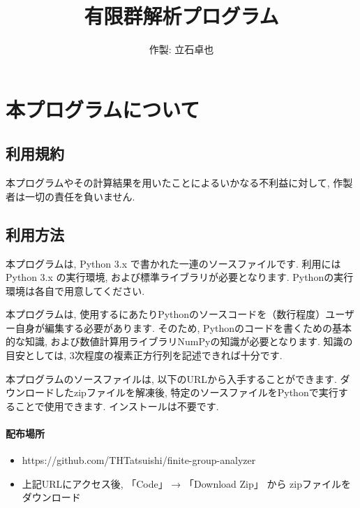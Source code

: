 \documentclass[11pt, a4paper]{jsarticle}
\title{
有限群解析プログラム
}
\author{
作製: 立石卓也
}
\begin{document}
\maketitle
\tableofcontents
\newpage
\section{本プログラムについて}

\subsection{利用規約}
本プログラムやその計算結果を用いたことによるいかなる不利益に対して, 作製者は一切の責任を負いません.

\subsection{利用方法} \label{sec:way}
本プログラムは, Python 3.x で書かれた一連のソースファイルです.
利用にはPython 3.x の実行環境, および標準ライブラリが必要となります.
Pythonの実行環境は各自で用意してください.

本プログラムは, 使用するにあたりPythonのソースコードを（数行程度）ユーザー自身が編集する必要があります.
そのため, Pythonのコードを書くための基本的な知識, および数値計算用ライブラリNumPyの知識が必要となります.
知識の目安としては, 3次程度の複素正方行列を記述できれば十分です.

本プログラムのソースファイルは, 以下のURLから入手することができます.
ダウンロードしたzipファイルを解凍後, 特定のソースファイルをPythonで実行することで使用できます.
インストールは不要です.

\paragraph{配布場所}
\begin{itemize}
\item https://github.com/THTatsuishi/finite-group-analyzer
\item 上記URLにアクセス後, 「Code」 → 「Download Zip」 から zipファイルをダウンロード
\end{itemize}
\end{document}
